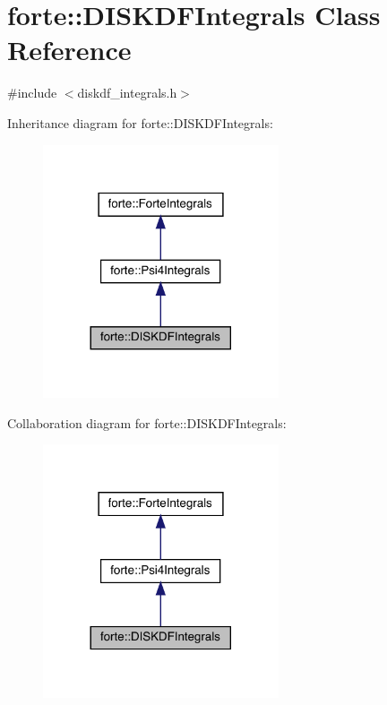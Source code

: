 \hypertarget{classforte_1_1_d_i_s_k_d_f_integrals}{}\section{forte\+:\+:D\+I\+S\+K\+D\+F\+Integrals Class Reference}
\label{classforte_1_1_d_i_s_k_d_f_integrals}


{\ttfamily \#include $<$diskdf\+\_\+integrals.\+h$>$}



Inheritance diagram for forte\+:\+:D\+I\+S\+K\+D\+F\+Integrals\+:
\nopagebreak
\begin{figure}[H]
\begin{center}
\leavevmode
\includegraphics[width=197pt]{classforte_1_1_d_i_s_k_d_f_integrals__inherit__graph}
\end{center}
\end{figure}


Collaboration diagram for forte\+:\+:D\+I\+S\+K\+D\+F\+Integrals\+:
\nopagebreak
\begin{figure}[H]
\begin{center}
\leavevmode
\includegraphics[width=197pt]{classforte_1_1_d_i_s_k_d_f_integrals__coll__graph}
\end{center}
\end{figure}
